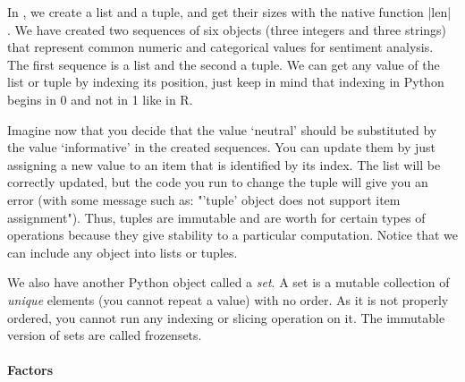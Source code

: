 In , we create a list and a tuple, and get their sizes with the native function |len|
. We have created two sequences of six objects
(three integers and three strings) that represent common numeric and
categorical values for sentiment analysis. The first sequence is a
list and the second a tuple. We can get any value of the list or tuple
by indexing its position, just keep in mind that indexing in Python
begins in 0 and not in 1 like in R. 



Imagine now that you decide that the value `neutral' should be
substituted by the value `informative' in the created sequences. You
can update them by just assigning a new value to an item that is
identified by its index.  The list will be correctly updated, but the
code you run to change the tuple will give you an error (with some
message such as: "'tuple' object does not support item
assignment"). Thus, tuples are immutable and are worth for certain
types of operations because they give stability to a particular
computation. Notice that we can include any object into lists or
tuples.


We also have another Python object called a \emph{set}. A set is a mutable
collection of \emph{unique} elements (you cannot repeat a value) with
no order. As it is not properly ordered, you cannot run any indexing
or slicing operation on it. The immutable version of sets are called
frozensets.









\paragraph{Factors}

